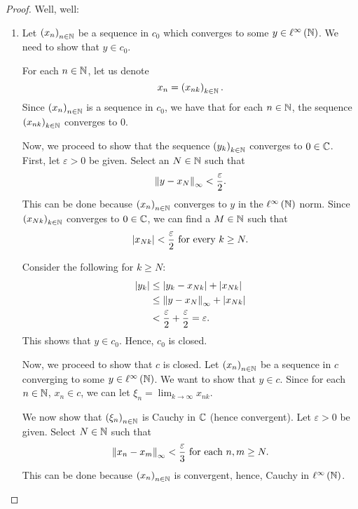 \begin{proof}
    Well, well:
    \begin{enumerate}[label=(\alph*)]
	\item Let $\left( x_{n} \right)_{n\in \mathbb N}$ be a sequence in $c_{0}$ which converges to some $y \in \ell ^{\infty} \left( \mathbb N \right)$. We need to show that $y \in c_{0}$.

	    For each $n \in \mathbb N$, let us denote
	    \begin{equation*}
		x_n = \left( x_{nk} \right)_{k\in \mathbb N}.
	    \end{equation*}
	    Since $\left( x_{n} \right)_{n \in \mathbb N}$ is a sequence in $c_{0}$, we have that for each $n\in \mathbb N$, the sequence $\left( x_{nk} \right)_{k\in \mathbb N}$ converges to $0$.

	    Now, we proceed to show that the sequence $\left( y_{k} \right)_{k \in \mathbb N}$ converges to $0 \in \mathbb C$. First, let $\varepsilon > 0$ be given. Select an $N \in \mathbb N$ such that 
	    \begin{equation*}
		\left\lVert y-x_{N} \right\rVert_{\infty} < \frac{\varepsilon}{2}.
	    \end{equation*}
	    This can be done because $\left( x_{n} \right)_{n\in \mathbb N}$ converges to $y$ in the $\ell ^{\infty} \left( \mathbb N \right)$ norm. Since $\left( x_{Nk} \right)_{k\in \mathbb N}$ converges to $0 \in \mathbb C$, we can find a $M \in \mathbb N$ such that
	    \begin{equation*}
		\left\lvert x_{Nk} \right\rvert< \frac{\varepsilon}{2} \text{ for every } k \ge N.
	    \end{equation*}

	    Consider the following for $k \ge N$:
	    \begin{align*}
		\left\lvert y_{k} \right\rvert &\le \left\lvert y_{k}-x_{Nk} \right\rvert + \left\lvert x_{Nk} \right\rvert \\
		&\le \left\lVert y-x_{N} \right\rVert_{\infty} + \left\lvert x_{Nk} \right\rvert \\
		& < \frac{\varepsilon}{2} + \frac{\varepsilon}{2} = \varepsilon.
	    \end{align*}
	    This shows that $y \in c_{0}$. Hence, $c_{0}$ is closed.

	    Now, we proceed to show that $c$ is closed. Let $\left( x_{n} \right)_{n\in \mathbb N}$ be a sequence in $c$ converging to some $y \in \ell ^{\infty} \left( \mathbb N \right)$. We want to show that $y \in c$. Since for each $n\in \mathbb N$, $x_{n} \in c$, we can let $\xi_{n} = \lim_{k \to \infty} x_{nk}$.

	    We now show that $\left( \xi_{n} \right)_{n\in \mathbb N}$ is Cauchy in $\mathbb C$ (hence convergent). Let $\varepsilon > 0$ be given. Select $N \in \mathbb N$ such that
	    \begin{equation*}
		\left\lVert x_{n}-x_{m} \right\rVert_{\infty} < \frac{\varepsilon}{3} \text{ for each } n,m \ge N.
	    \end{equation*}
	    This can be done because $\left( x_{n} \right)_{n\in \mathbb N}$ is convergent, hence, Cauchy in $\ell ^{\infty} \left( \mathbb N \right)$.


\end{enumerate}
\end{proof}
